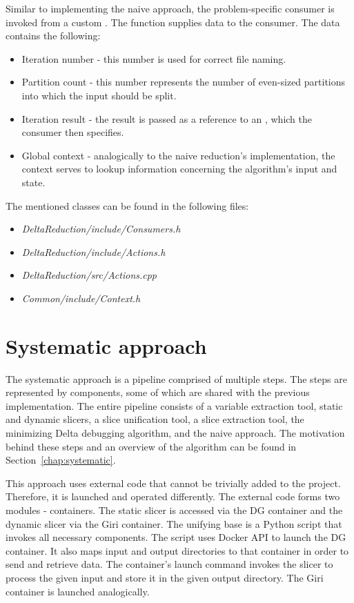 Similar to implementing the naive approach, the problem-specific consumer is 
invoked from a custom . 
The  function supplies 
data to the consumer. 
The data contains the following:
\begin{itemize}
  \item Iteration number - this number is used for correct file naming.
  \item Partition count - this number represents the number of even-sized 
  partitions into which the input should be split.
  \item Iteration result - the result is passed as a reference to 
  an , which the consumer then specifies.
  \item Global context - analogically to the naive reduction's implementation, 
  the context serves to lookup information concerning the algorithm's input 
  and state.
\end{itemize}
The mentioned classes can be found in the following files: 
\begin{itemize}
  \item \emph{DeltaReduction/include/Consumers.h} 
  \item \emph{DeltaReduction/include/Actions.h} 
  \item \emph{DeltaReduction/src/Actions.cpp}
  \item \emph{Common/include/Context.h}
\end{itemize}

\section{Systematic approach}

The systematic approach is a pipeline comprised of multiple steps. 
The steps are represented by components, some of which are shared with 
the previous implementation. 
The entire pipeline consists of a variable extraction tool, static and 
dynamic slicers, a slice unification tool, a slice extraction tool, 
the minimizing Delta debugging algorithm, and the naive approach. 
The motivation behind these steps and an overview of the algorithm can be 
found in Section~\ref{chap:systematic}.

This approach uses external code that cannot be trivially added to 
the project.
Therefore, it is launched and operated differently.
The external code forms two modules - containers. 
The static slicer is accessed via the DG container and the dynamic slicer 
via the Giri container. 
The unifying base is a Python script that invokes all necessary components.
The script uses Docker API to launch the DG container.
It also maps input and output directories to that container in order to send 
and retrieve data.
The container's launch command invokes the slicer to process the given input 
and store it in the given output directory.
The Giri container is launched analogically.

